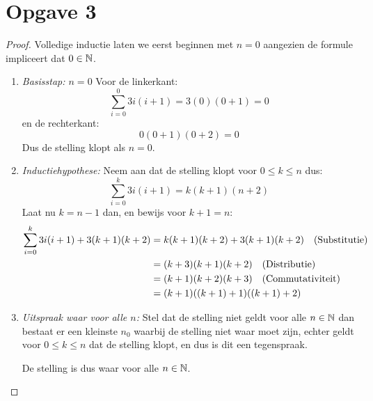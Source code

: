 \documentclass{article}
\begin{document}
\section*{Opgave 3}
\begin{proof}
	Volledige inductie laten we eerst beginnen met $n=0$ aangezien de formule impliceert dat $0 \in \mathbb{N}$.
	\begin{enumerate}
		\item \emph{Basisstap: $n = 0$}
		Voor de linkerkant:
			\[\sum_{i = 0}^{0}3i(i + 1) = 3(0)(0+1) = \boxed{0}\]
		en de rechterkant:	
			\[0(0+1)(0+2) = \boxed{0} \]
			Dus de stelling klopt als $n = 0$.
		\item \emph{Inductiehypothese:}
			Neem aan dat de stelling klopt voor $0 \leq k \leq n$ dus: 
			\[ \sum_{i = 0}^{k} 3i(i +1) = k(k+1)(n+2) \]
			Laat nu $k = n-1$ dan, en bewijs voor $k + 1 = n$:
			\begin{align*}
				\sum_{i= 0}^{k} 3i(i + 1) + 3(k+1)(k + 2) &= k(k+1)(k+2) + 3(k+1)(k+2) \quad (\text{Substitutie}) \\ 
				&= (k + 3)(k+1)(k+2) \quad (\text{Distributie}) \\
				&= (k + 1)(k+2)(k+3) \quad (\text{Commutativiteit}) \\
				&= (k + 1)((k+1) + 1)((k+1)+ 2)
			\end{align*}
		\item \emph{Uitspraak waar voor alle $n$:}
		Stel dat de stelling niet geldt voor alle $n \in \mathbb{N}$ dan bestaat er een kleinste $n_0$ waarbij de stelling niet waar moet zijn,
		echter geldt voor $0 \leq k \leq n$ dat de stelling klopt, en dus is dit een tegenspraak.
		
		De stelling is dus waar voor alle $n \in \mathbb{N}$.
	\end{enumerate}
\end{proof}
\end{document}
